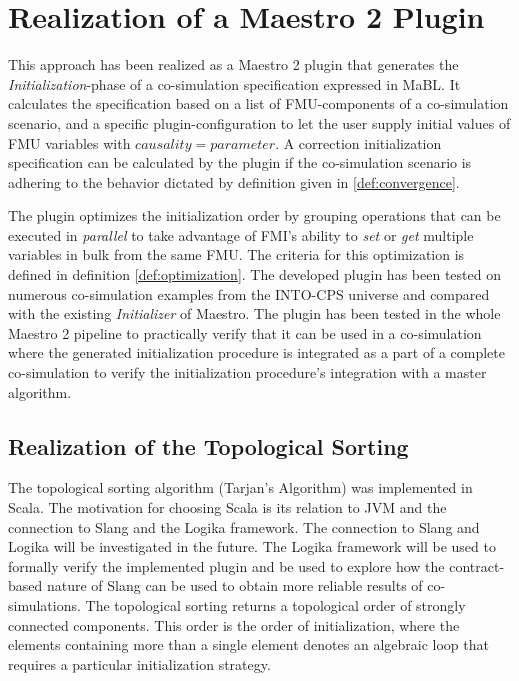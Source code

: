 \section{Realization of a Maestro 2 Plugin}\label{sc:implementation}
This approach has been realized as a Maestro 2 plugin that generates the \textit{Initialization}-phase of a co-simulation specification expressed in MaBL. It calculates the specification based on a list of FMU-components of a co-simulation scenario, and a specific plugin-configuration to let the user supply initial values of FMU variables with $causality=parameter$. A correction initialization specification can be calculated by the plugin if the co-simulation scenario is adhering to the behavior dictated by definition given in \ref{def:convergence}.

The plugin optimizes the initialization order by grouping operations that can be executed in \textit{parallel} to take advantage of FMI's ability to \textit{set} or \textit{get} multiple variables in bulk from the same FMU. The criteria for this optimization is defined in definition \ref{def:optimization}. 
The developed plugin has been tested on numerous co-simulation examples from the INTO-CPS universe\cite{Maestro} and compared with the existing \textit{Initializer} of Maestro. The plugin has been tested in the whole Maestro 2 pipeline to practically verify that it can be used in a co-simulation where the generated initialization procedure is integrated as a part of a complete co-simulation to verify the initialization procedure's integration with a master algorithm.

\subsection{Realization of the Topological Sorting}
The topological sorting algorithm (Tarjan's Algorithm) was implemented in Scala. The motivation for choosing Scala is its relation to JVM and the connection to Slang and the Logika framework\cite{inbook}. The connection to Slang and Logika will be investigated in the future. The Logika framework will be used to formally verify the implemented plugin and be used to explore how the contract-based nature of Slang can be used to obtain more reliable results of co-simulations. The topological sorting returns a topological order of strongly connected components. This order is the order of initialization, where the elements containing more than a single element denotes an algebraic loop that requires a particular initialization strategy. 

